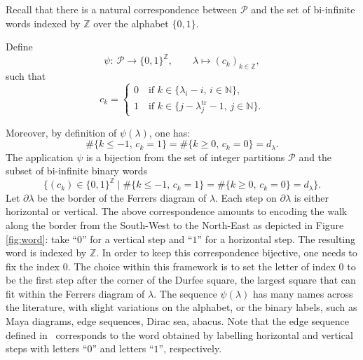 \documentclass[pdftex]{sigma}
\numberwithin{equation}{section}
\def\ccp{\mathcal P}
\newcommand{\Z}{\mathbb{Z}}
\newcommand{\N}{\mathbb{N}}
\begin{document}
Recall that there is a natural correspondence between $\ccp$ and the set of bi-infinite words indexed by $\Z$ over the alphabet $\lbrace 0,1\rbrace$.
\begin{Definition}\label{def:psi}
Define
\[
\psi\colon \   \ccp   \to   \lbrace 0,1\rbrace^{\Z}, \qquad
   \lambda  \mapsto  (c_k)_{k\in\Z},
\]
such that
 \[c_k=\begin{cases}
 0 \quad \text{if } k\in\lbrace \lambda_i-i,\, i\in\N\rbrace,\\
 1 \quad \text{if } k\in \lbrace j-\lambda_j^{\mathrm{tr}}-1,\, j\in\N\rbrace.
 \end{cases}\]
\end{Definition}
Moreover, by definition of $\psi(\lambda)$, one has:
\begin{equation}\label{eq:balance}
\#\{k\leq-1,\, c_k=1\}= \#\{k\geq0,\, c_k=0\}=d_\lambda.
\end{equation}
 The application $\psi$ is a bijection from the set of integer partitions $\ccp$ and the subset of bi-infinite binary words
 \[\bigl\lbrace (c_k)\in\lbrace 0,1\rbrace^{\Z}\mid \#\{k\leq-1,\,c_k=1\}= \#\{k\geq0,\,c_k=0\}=d_\lambda\bigr\rbrace.\]
 Let $\partial \lambda$ be the border of the Ferrers diagram of $\lambda$. Each step on $\partial\lambda$ is either horizontal or vertical. The above correspondence amounts to encoding the walk along the border from the South-West to the North-East as depicted in Figure \ref{fig:word}: take ``$0$'' for a vertical step and ``$1$'' for a horizontal step. The resulting word is indexed by $\Z$. In order to keep this correspondence bijective, one needs to fix the index $0$. The choice within this framework is to set the letter of index $0$ to be the first step after the corner of the Durfee square, the largest square that can fit within the Ferrers diagram of $\lambda$. The sequence $\psi(\lambda)$ has many names across the literature, with slight variations on the alphabet, or the binary labels, such as Maya diagrams, edge sequences, Dirac sea, abacus. Note that the edge sequence defined in~\cite{LLMSmem} corresponds to the word obtained by labelling horizontal and vertical steps with letters ``$0$'' and letters ``$1$'', respectively.
\end{document}
